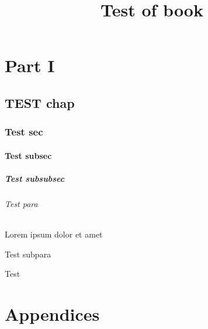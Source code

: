 \documentclass[10pt]{book}
\title{Test of book}
\begin{document}
    \tableofcontents
    
    
    \part{Part I}
    
    \chapter{TEST chap}
    \section{Test sec}
    \subsection{Test subsec}
    \subsubsection{Test subsubsec}
    \paragraph{Test para} Lorem ipsum dolor et amet
    \subparagraph{Test subpara}
    Test
    \part*{Appendices}
\end{document}
